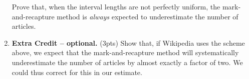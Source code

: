 \documentclass[10pt]{article}
\begin{document}
\begin{enumerate}
Prove that, when the interval lengths are not perfectly uniform, the mark-and-recapture method is \emph{always} expected to underestimate the number of articles.

\item \textbf{Extra Credit -- optional.} (3pts) Show that, if Wikipedia uses the scheme above, we expect that the mark-and-recapture method will systematically underestimate the number of articles by almost exactly a factor of two. We could thus correct for this in our estimate. 

\end{enumerate}


%
\end{document}
